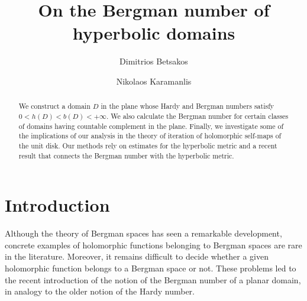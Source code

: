 \documentclass[11pt, letterpaper,leqno]{amsart}
\numberwithin{equation}{section}
\theoremstyle{definition}
\begin{document}
	\title[On the Bergman number of hyperbolic domains]{On the Bergman number of hyperbolic domains}
	
	\author{Dimitrios Betsakos}  
	\address{Department of Mathematics, Aristotle University of Thessaloniki, 54124, Thessaloniki, Greece}
	
	\author{Nikolaos Karamanlis}
	\address{Department of Mathematics, University of Thessaly, 3rd Km Old National Road Lamia-Athens, 35100, Lamia, Greece}
	
	
	
	
	\date{}
	
	
	\begin{abstract} 
	We construct a domain $D$ in the plane whose Hardy and Bergman numbers satisfy $0<h(D)<b(D)<+\infty$. We also calculate the Bergman number for certain classes of domains having countable complement in the plane. Finally, we investigate some of the implications of our analysis in the theory of iteration of holomorphic self-maps of the unit disk. Our methods rely on estimates for the hyperbolic metric and a recent result \cite{CZRP} that connects the Bergman number with the hyperbolic metric.
	\end{abstract}
	
	\maketitle


\section{Introduction}
Although the theory of Bergman spaces has seen a remarkable development, concrete examples of holomorphic functions belonging to Bergman spaces are rare in the literature. Moreover, it remains difficult to decide whether a given holomorphic function belongs to a Bergman space or not. These problems
led to the recent introduction of the notion of the Bergman number of a planar domain, in analogy to the older notion of the Hardy number. 
\end{document}
